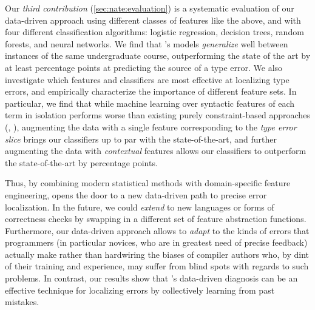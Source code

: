 Our \emph{third contribution} (\autoref{sec:nate:evaluation})
is a systematic evaluation of our data-driven approach
using different classes of features like the above, and
with four different classification algorithms: logistic
regression, decision trees, random forests, and neural networks.
%
We find that \toolname's models \emph{generalize} well
between instances of the same undergraduate course, outperforming
the state of the art by at least \ToolnameWinSherrloc
percentage points at predicting the source of a type error.
%
We also investigate which features and classifiers
are most effective at localizing type errors, and
empirically characterize the importance of different
feature sets.
%
In particular, we find that while machine learning
over syntactic features of each term in isolation
performs worse than existing
purely constraint-based approaches (\eg \ocaml, \sherrloc),
augmenting the data with a single feature corresponding to
the \emph{type error slice} \citep{Tip2001-qp} brings our
classifiers up to par with the state-of-the-art,
and further augmenting the data with \emph{contextual}
features allows our classifiers to outperform
the state-of-the-art by \ToolnameWinSherrloc percentage points.

Thus, by combining modern statistical methods
with domain-specific feature engineering, \toolname
opens the door to a new data-driven path to
precise error localization.
%
In the future, we could \emph{extend}
\toolname to new languages or forms
of correctness checks by swapping in
a different set of feature abstraction
functions.
%
Furthermore, our data-driven approach
allows \toolname to \emph{adapt} to
the kinds of errors that programmers
(in particular novices, who are in greatest
need of precise feedback) actually make
rather than hardwiring the biases of
compiler authors who, by dint of their
training and experience, may suffer from
blind spots with regards to such problems.
%
In contrast, our results show that \toolname's
data-driven diagnosis can be an effective
technique for localizing errors by collectively
learning from past mistakes.

